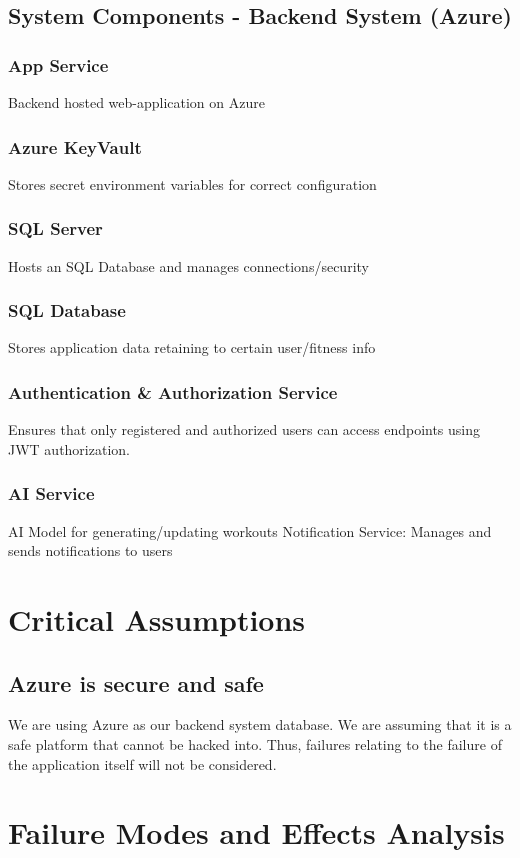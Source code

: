 \documentclass{article}
\begin{document}
    \subsection{System Components - Backend System (Azure)}
    \subsubsection{App Service} Backend hosted web-application on Azure
    \subsubsection{Azure KeyVault} Stores secret environment variables for correct configuration
    \subsubsection{SQL Server} Hosts an SQL Database and manages connections/security
    \subsubsection{SQL Database} Stores application data retaining to certain user/fitness info
    \subsubsection{Authentication \& Authorization Service} Ensures that only registered and authorized users can access endpoints using JWT authorization.
    \subsubsection{AI Service} AI Model for generating/updating workouts
    Notification Service: Manages and sends notifications to users

    \section{Critical Assumptions}
    \subsection{Azure is secure and safe}
    We are using Azure as our backend system database. We are assuming that it is a safe platform that cannot be hacked into. Thus, failures relating to the failure of the application itself will not be considered.

    \section{Failure Modes and Effects Analysis}
\end{document}
